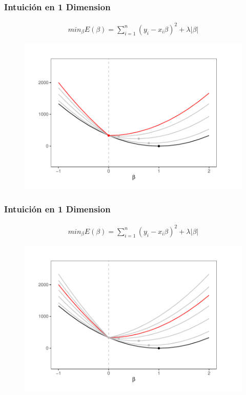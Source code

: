 \documentclass[
  shownotes,
  xcolor={svgnames},
  hyperref={colorlinks,citecolor=DarkBlue,linkcolor=DarkRed,urlcolor=DarkBlue}
  , aspectratio=169]{beamer}
\begin{document}
\begin{frame}[fragile]
\frametitle{Intuición en 1 Dimension}

\begin{align}
 min_{\beta} E(\beta) = \sum_{i=1}^n (y_i-x_i \beta)^2 + \lambda|\beta| 
\end{align}

   \begin{figure}[H] \centering
            \captionsetup{justification=centering}
              \includegraphics[scale=0.6]{figures/lasso6.pdf}
 \end{figure}


\end{frame}
\begin{frame}[fragile]
\frametitle{Intuición en 1 Dimension}

\begin{align}
 min_{\beta} E(\beta) = \sum_{i=1}^n (y_i-x_i \beta)^2 + \lambda|\beta| 
\end{align}

   \begin{figure}[H] \centering
            \captionsetup{justification=centering}
              \includegraphics[scale=0.6]{figures/lasso_final.pdf}
 \end{figure}

 \end{frame}
\end{document}
